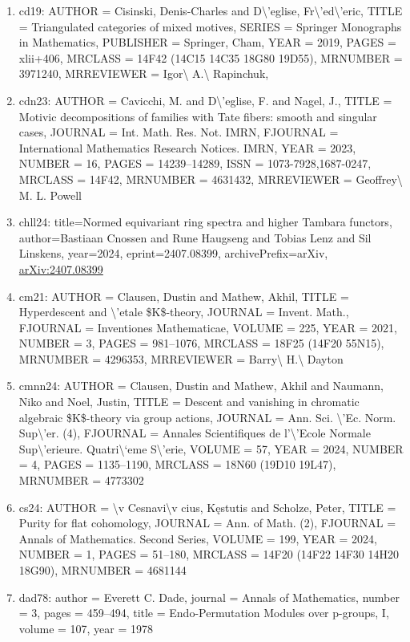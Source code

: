 \documentclass[11pt]{article}
\begin{document}
\begin{enumerate}[leftmargin=*]
  \item cd19: AUTHOR = Cisinski, Denis-Charles and D\textbackslash{}'eglise, Fr\textbackslash{}'ed\textbackslash{}'eric, TITLE = Triangulated categories of mixed motives, SERIES = Springer Monographs in Mathematics, PUBLISHER = Springer, Cham, YEAR = 2019, PAGES = xlii+406, MRCLASS = 14F42 (14C15 14C35 18G80 19D55), MRNUMBER = 3971240, MRREVIEWER = Igor\textbackslash{} A.\textbackslash{} Rapinchuk,
  \item cdn23: AUTHOR = Cavicchi, M. and D\textbackslash{}'eglise, F. and Nagel, J., TITLE = Motivic decompositions of families with Tate fibers: smooth and singular cases, JOURNAL = Int. Math. Res. Not. IMRN, FJOURNAL = International Mathematics Research Notices. IMRN, YEAR = 2023, NUMBER = 16, PAGES = 14239--14289, ISSN = 1073-7928,1687-0247, MRCLASS = 14F42, MRNUMBER = 4631432, MRREVIEWER = Geoffrey\textbackslash{} M. L. Powell
  \item chll24: title=Normed equivariant ring spectra and higher Tambara functors, author=Bastiaan Cnossen and Rune Haugseng and Tobias Lenz and Sil Linskens, year=2024, eprint=2407.08399, archivePrefix=arXiv, \href{https://arxiv.org/abs/2407.08399}{arXiv:2407.08399}
  \item cm21: AUTHOR = Clausen, Dustin and Mathew, Akhil, TITLE = Hyperdescent and \textbackslash{}'etale \$K\$-theory, JOURNAL = Invent. Math., FJOURNAL = Inventiones Mathematicae, VOLUME = 225, YEAR = 2021, NUMBER = 3, PAGES = 981--1076, MRCLASS = 18F25 (14F20 55N15), MRNUMBER = 4296353, MRREVIEWER = Barry\textbackslash{} H.\textbackslash{} Dayton
  \item cmnn24: AUTHOR = Clausen, Dustin and Mathew, Akhil and Naumann, Niko and Noel, Justin, TITLE = Descent and vanishing in chromatic algebraic \$K\$-theory via group actions, JOURNAL = Ann. Sci. \textbackslash{}'Ec. Norm. Sup\textbackslash{}'er. (4), FJOURNAL = Annales Scientifiques de l'\textbackslash{}'Ecole Normale Sup\textbackslash{}'erieure. Quatri\textbackslash{}`eme S\textbackslash{}'erie, VOLUME = 57, YEAR = 2024, NUMBER = 4, PAGES = 1135--1190, MRCLASS = 18N60 (19D10 19L47), MRNUMBER = 4773302
  \item cs24: AUTHOR = \textbackslash{}v Cesnavi\textbackslash{}v cius, Kęstutis and Scholze, Peter, TITLE = Purity for flat cohomology, JOURNAL = Ann. of Math. (2), FJOURNAL = Annals of Mathematics. Second Series, VOLUME = 199, YEAR = 2024, NUMBER = 1, PAGES = 51--180, MRCLASS = 14F20 (14F22 14F30 14H20 18G90), MRNUMBER = 4681144
  \item dad78: author = Everett C. Dade, journal = Annals of Mathematics, number = 3, pages = 459--494, title = Endo-Permutation Modules over p-groups, I, volume = 107, year = 1978

\end{enumerate}
\end{document}
